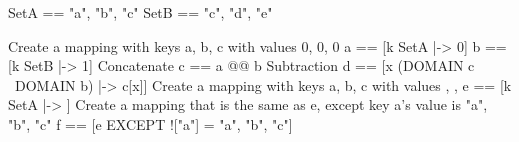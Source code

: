 \begin{tla}
SetA == {"a", "b", "c"}
SetB == {"c", "d", "e"}

\* Create a mapping with keys a, b, c with values 0, 0, 0
a == [k \in SetA |-> 0]
b == [k \in SetB |-> 1]
\* Concatenate 
c == a @@ b
\* Subtraction
d == [x \in (DOMAIN c \ DOMAIN b) |-> c[x]]
\* Create a mapping with keys a, b, c with values {}, {}, {}
e == [k \in SetA |-> {}]
\* Create a mapping that is the same as e, except key a's value is {"a", "b", "c"}
f == [e EXCEPT !["a"] = {"a", "b", "c"}] 

\end{tla}
\begin{tlatex}
%
%
\@pvspace{8.0pt}%
\@x{}%
%
\@xx{}%
%
%
\@x{}%
%
\@xx{}%
%
\@x{}%
%
\@xx{}%
\@x{}%
%
\@xx{}%
%
\@x{}%
%
\@xx{}%
\@pvspace{8.0pt}%
\end{tlatex}
